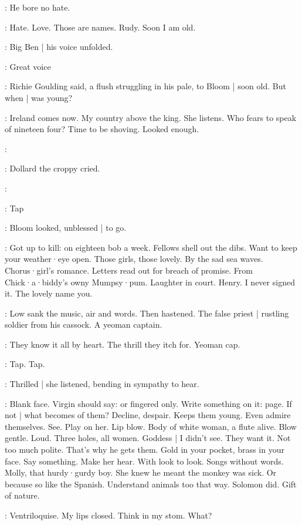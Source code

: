:
He bore no hate.

\BloomIntB:
Hate.
Love.
Those are names.
Rudy.
Soon I am old.

:
Big Ben |
his voice unfolded.

\goulding:
Great voice

:
Richie Goulding said,
a flush struggling in his pale,
to Bloom |
soon old.
But when |
was young?

\BloomIntA:
Ireland comes now.
My country above the king.
She listens.
Who fears to speak of nineteen four?
Time to be shoving.
Looked enough.

\dollard:

:
Dollard the croppy cried.

\dollard:

\stripling:
Tap

:
Bloom looked,
unblessed |
to go.

\BloomIntB:
Got up to kill:
on eighteen bob a week.
Fellows shell out the dibs.
Want to keep your weather·eye open.
Those girls,
those lovely.
By the sad sea waves.
Chorus·girl's romance.
Letters read out for breach of promise.
From Chick·a·biddy's owny Mumpsy·pum.
Laughter in court.
Henry.
I never signed it.
The lovely name you.

:
Low sank the music,
air and words.
Then hastened.
The false priest |
rustling soldier from his cassock.
A yeoman captain.

\BloomIntA:
They know it all by heart.
The thrill they itch for.
Yeoman cap.

\stripling:
Tap.
Tap.

:
Thrilled |
she listened,
bending in sympathy to hear.

\BloomIntB:
Blank face.
Virgin should say:
or fingered only.
Write something on it:
page.
If not |
what becomes of them?
Decline,
despair.
Keeps them young.
Even admire themselves.
See.
Play on her.
Lip blow.
Body of white woman,
a flute alive.
Blow gentle.
Loud.
Three holes,
all women.
Goddess |
I didn't see.
They want it.
Not too much polite.
That's why he gets them.
Gold in your pocket,
brass in your face.
Say something.
Make her hear.
With look to look.
Songs without words.
Molly,
that hurdy·gurdy boy.
She knew he meant the monkey was sick.
Or because so like the Spanish.
Understand animals too that way.
Solomon did.
Gift of nature.

\BloomIntB:
Ventriloquise.
My lips closed.
Think in my stom.
What?

